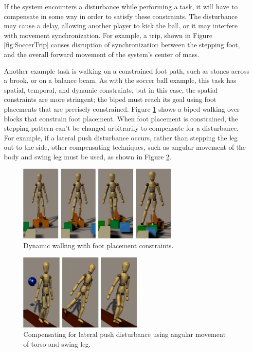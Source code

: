 \documentclass{llncs}
\begin{document}
If the system encounters a disturbance while performing a task, it will have to compensate in some way in order to satisfy these constraints.  
The disturbance may cause a delay, allowing another player to kick the ball, or it may interfere with movement synchronization.  
For example, a trip, shown in Figure \ref{fig:SoccerTrip} causes disruption of synchronization between the stepping foot, and the overall forward movement 
of the system’s center of mass. 

Another example task is walking on a constrained foot path, such as stones across a brook, or on a balance beam.  
As with the soccer ball example, this task has spatial, temporal, and dynamic constraints, but in this case, the spatial constraints are more stringent;  
the biped must reach its goal using foot placements that are precisely constrained. 
Figure \ref{fig:WalkOnStonesIntro1} shows a biped walking over blocks that constrain foot placement.  
When foot placement is constrained, the stepping pattern can’t be changed arbitrarily to compensate for a disturbance.  
For example, if a lateral push disturbance occurs, rather than stepping the leg out to the side, other compensating techniques, 
such as angular movement of the body and swing leg must be used, as shown in Figure \ref{fig:LatPushIntro1}.

\begin{figure}%
\centering
\includegraphics[height=1.5in]{WalkOnStonesIntro1}
\caption{Dynamic walking with foot placement constraints.}
\label{fig:WalkOnStonesIntro1}       
\end{figure}

\begin{figure}%
\centering
\includegraphics[height=1.5in]{LatPushIntro1}
\caption{Compensating for lateral push disturbance using angular movement of torso and swing leg.}
\label{fig:LatPushIntro1}       
\end{figure}
\end{document}

